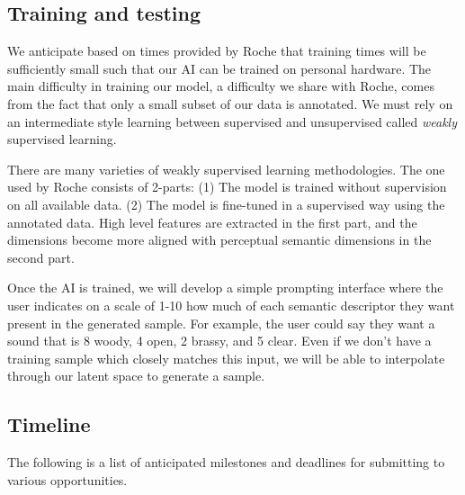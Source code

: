 \documentclass{article}
\begin{document}
\subsection{Training and testing}

We anticipate based on times provided by Roche that training times will be sufficiently small such that our AI can be trained on personal hardware. \cite{Roche2020} The main difficulty in training our model, a difficulty we share with Roche, comes from the fact that only a small subset of our data is annotated. We must rely on an intermediate style learning between supervised and unsupervised called \textit{weakly} supervised learning. \cite{Zhou2017}

There are many varieties of weakly supervised learning methodologies. The one used by Roche consists of 2-parts: (1) The model is trained without supervision on all available data. (2) The model is fine-tuned in a supervised way using the annotated data. \cite{Roche2020} High level features are extracted in the first part, and the dimensions become more aligned with perceptual semantic dimensions in the second part. \cite{Esling2018}

Once the AI is trained, we will develop a simple prompting interface where the user indicates on a scale of 1-10 how much of each semantic descriptor they want present in the generated sample. For example, the user could say they want a sound that is 8 woody, 4 open, 2 brassy, and 5 clear. Even if we don't have a training sample which closely matches this input, we will be able to interpolate through our latent space to generate a sample. \cite{Tatar2021}

\subsection{Timeline}

The following is a list of anticipated milestones and deadlines for submitting to various opportunities. 
\end{document}
